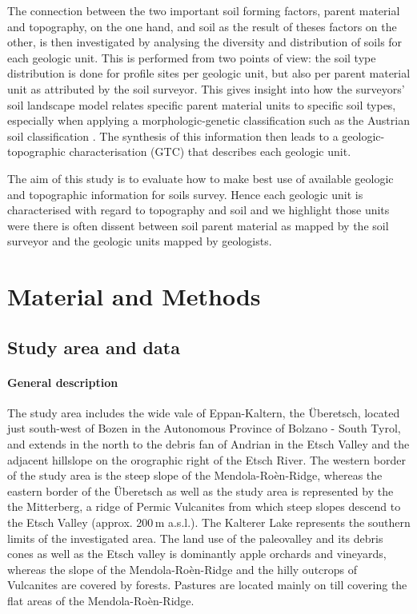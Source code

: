 \documentclass[preprint,12pt,authoryear]{elsarticle}
\begin{document}
The connection between the two important soil forming factors, parent material and topography, on the one hand, and soil as the result of theses factors on the other, is then investigated by analysing the diversity and distribution of soils for each geologic unit. This is performed from two points of view: the soil type distribution is done for profile sites per geologic unit, but also per parent material unit as attributed by the soil surveyor. This gives insight into how the surveyors' soil landscape model relates specific parent material units to specific soil types, especially when applying a morphologic-genetic classification such as the Austrian soil classification \citep{Nestroy2011}. The synthesis of this information then leads to a geologic-topographic characterisation (GTC) that describes each geologic unit. 

The aim of this study is to evaluate how to make best use of available geologic and topographic information for soils survey. Hence each geologic unit is characterised with regard to topography and soil and we highlight those units were there is often dissent between soil parent material as mapped by the soil surveyor and the geologic units mapped by geologists.



\section{Material and Methods}
\subsection{Study area and data}
\paragraph{General description}
The study area includes the wide vale of Eppan-Kaltern, the {\"U}beretsch, located just south-west of Bozen in the Autonomous Province of Bolzano - South Tyrol, and extends in the north to the debris fan of Andrian in the Etsch Valley and the adjacent hillslope on the orographic right of the Etsch River. The western border of the study area is the steep slope of the Mendola-Ro\`en-Ridge, whereas the eastern border of the {\"U}beretsch as well as the study area is represented by the the Mitterberg, a ridge of Permic Vulcanites from which steep slopes descend to the Etsch Valley (approx. 200\,m a.s.l.). The Kalterer Lake represents the southern limits of the investigated area. The land use of the paleovalley and its debris cones as well as the Etsch valley is dominantly apple orchards and vineyards, whereas the slope of the  Mendola-Ro\`en-Ridge and the hilly outcrops of Vulcanites are covered by forests. Pastures are located mainly on till covering the flat areas of the  Mendola-Ro\`en-Ridge. 
\end{document}
